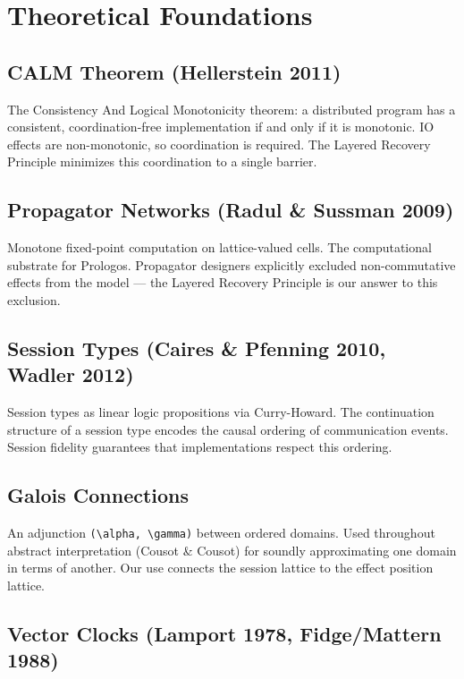 \documentclass[11pt]{article}
\begin{document}
\section{Theoretical Foundations}
\label{sec:orgda49677}

\subsection{CALM Theorem (Hellerstein 2011)}
\label{sec:org7493866}

The Consistency And Logical Monotonicity theorem: a distributed program has a
consistent, coordination-free implementation if and only if it is monotonic.
IO effects are non-monotonic, so coordination is required. The Layered Recovery
Principle minimizes this coordination to a single barrier.
\subsection{Propagator Networks (Radul \& Sussman 2009)}
\label{sec:orgdb9b339}

Monotone fixed-point computation on lattice-valued cells. The computational
substrate for Prologos. Propagator designers explicitly excluded non-commutative
effects from the model --- the Layered Recovery Principle is our answer to this
exclusion.
\subsection{Session Types (Caires \& Pfenning 2010, Wadler 2012)}
\label{sec:org74eeca2}

Session types as linear logic propositions via Curry-Howard. The continuation
structure of a session type encodes the causal ordering of communication events.
Session fidelity guarantees that implementations respect this ordering.
\subsection{Galois Connections}
\label{sec:orga9a9a9a}

An adjunction \texttt{(\textbackslash{}alpha, \textbackslash{}gamma)} between ordered domains. Used throughout abstract
interpretation (Cousot \& Cousot) for soundly approximating one domain in terms
of another. Our use connects the session lattice to the effect position lattice.
\subsection{Vector Clocks (Lamport 1978, Fidge/Mattern 1988)}
\label{sec:orga87232b}
\end{document}
